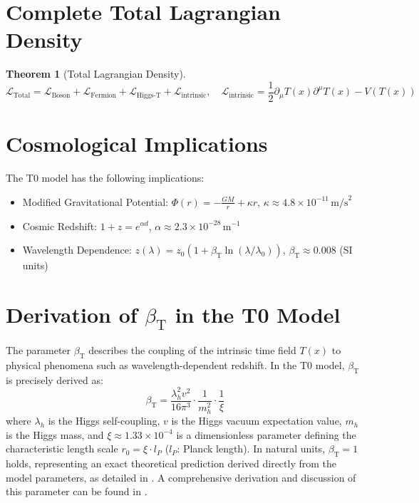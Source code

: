 \documentclass[12pt,a4paper]{article}
\newcommand{\Tfield}{T(x)}
\newcommand{\betaT}{\beta_{\text{T}}}
\newtheorem{theorem}{Theorem}[section]
\theoremstyle{definition}
\theoremstyle{remark}
\begin{document}
	\section{Complete Total Lagrangian Density}
	\begin{theorem}[Total Lagrangian Density]
		\begin{equation}
			\mathcal{L}_{\text{Total}} = \mathcal{L}_{\text{Boson}} + \mathcal{L}_{\text{Fermion}} + \mathcal{L}_{\text{Higgs-T}} + \mathcal{L}_{\text{intrinsic}}, \quad \mathcal{L}_{\text{intrinsic}} = \frac{1}{2} \partial_\mu \Tfield \partial^\mu \Tfield - V(\Tfield)
		\end{equation}
	\end{theorem}
	
	\section{Cosmological Implications}
	The T0 model has the following implications:
	\begin{itemize}
		\item Modified Gravitational Potential: \( \Phi(r) = -\frac{GM}{r} + \kappa r \), \( \kappa \approx 4.8 \times 10^{-11} \, \text{m/s}^2 \)
		\item Cosmic Redshift: \( 1 + z = e^{\alpha d} \), \( \alpha \approx 2.3 \times 10^{-28} \, \text{m}^{-1} \)
		\item Wavelength Dependence: \( z(\lambda) = z_0 (1 + \betaT \ln(\lambda/\lambda_0)) \), \( \betaT \approx 0.008 \) (SI units)
	\end{itemize}
	
	\section{Derivation of \(\betaT\) in the T0 Model}
	The parameter \(\betaT\) describes the coupling of the intrinsic time field \(\Tfield\) to physical phenomena such as wavelength-dependent redshift. In the T0 model, \(\betaT\) is precisely derived as:
	\begin{equation}
		\betaT = \frac{\lambda_h^2 v^2}{16\pi^3} \cdot \frac{1}{m_h^2} \cdot \frac{1}{\xi}
	\end{equation}
	where \(\lambda_h\) is the Higgs self-coupling, \(v\) is the Higgs vacuum expectation value, \(m_h\) is the Higgs mass, and \(\xi \approx 1.33 \times 10^{-4}\) is a dimensionless parameter defining the characteristic length scale \(r_0 = \xi \cdot l_P\) (\(l_P\): Planck length). In natural units, \(\betaT = 1\) holds, representing an exact theoretical prediction derived directly from the model parameters, as detailed in \cite{pascher_alphabeta_2025}. A comprehensive derivation and discussion of this parameter can be found in \cite{pascher_alphabeta_2025}.
	
\end{document}
